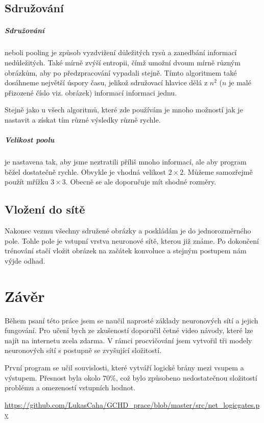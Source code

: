 \documentclass[12pt,a4paper]{report}
\begin{document}
	\section{Sdružování}
	 	\paragraph{Sdružování}
	 	neboli pooling je způsob vyzdvižení důležitých rysů a zanedbání informací nedůležitých. Také mírně zvýší entropii, čímž umožní dvoum mírně různým obrázkům, aby po předzpracování vypadali stejně. Tímto algoritmem také dosáhneme největší úspory času, jelikož sdružovací hlavice dělá z $n^2$ ($n$ je malé přizozené číslo viz. obrázek) informací informaci jednu.

		Stejně jako u všech algoritmů, které zde používám je mnoho možností jak je nastavit a získat tím různé výsledky různě rychle.
		\paragraph{Velikost poolu}
		je nastavena tak, aby jsme neztratili příliš mnoho informací, ale aby program běžel dostatečně rychle. Obvykle je vhodná velikost $2\times2$. Můžeme samozřejmě použít mřížku $3\times3$. Obecně se ale doporučuje mít shodné rozměry.
	\section{Vložení do sítě}
		Nakonec vezmu všechny sdružené obrázky a poskládám je do jednorozměrného pole. Tohle pole je vstupní vrstva neuronové sítě, kterou již známe. Po dokončení trénování stačí vložit obrázek na začátek konvoluce a stejným postupem nám výjde odhad.
		
\chapter{Závěr}
Během psaní této práce jsem se naučil naprosté základy neuronových sítí a jejich fungování. Pro učení bych ze zkušeností doporučil četné video návody, které lze najít na internetu zcela zdarma. V rámci procvičování jsem vytvořil tři modely neuronových sítí s postupně se zvyšující složitostí.

První program se učil souvislosti, které vytváří logické brány mezi vsupem a výstupem. Přesnost byla okolo $70\%$, což bylo způsobeno nedostatečnou složitostí problému a omezeností vstupních hodnot. 

\url{https://github.com/LukasCaha/GCHD_prace/blob/master/src/net_logicgates.py}
\end{document}
